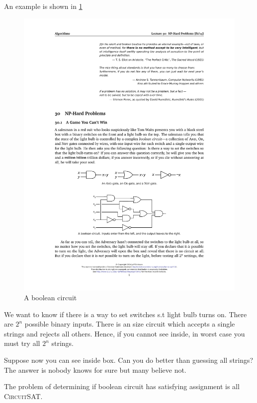 An example is shown in \cref{fig:lightbulb}
\begin{figure}[H]
    \centering
    \includegraphics[scale=1.5]{fig/lightbulb}
    \caption{A boolean circuit}
    \label{fig:lightbulb}
\end{figure}
We want to know if there is a way to set switches s.t
light bulb turns on.
There are $2^n$ possible binary inputs. There is an  size circuit
which accepts a single strings and rejects all others.
Hence, if you cannot see inside, in worst case you must try all $2^n$ strings.

Suppose now you can see inside box. Can you do better than guessing all strings?
The answer is nobody knows for sure but many believe not.

The problem of determining if boolean circuit has satisfying assignment is all
\textsc{CircuitSAT}.


